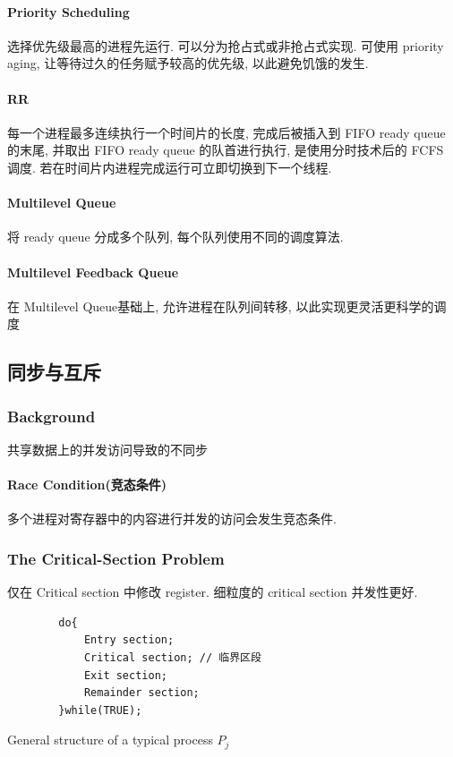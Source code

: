 \paragraph{Priority Scheduling}选择优先级最高的进程先运行. 可以分为抢占式或非抢占式实现. 可使用 priority aging, 让等待过久的任务赋予较高的优先级, 以此避免饥饿的发生. 

\paragraph{RR} 每一个进程最多连续执行一个时间片的长度, 完成后被插入到 FIFO ready queue 的末尾, 并取出 FIFO ready queue 的队首进行执行, 是使用分时技术后的 FCFS 调度. 若在时间片内进程完成运行可立即切换到下一个线程. 

\paragraph{Multilevel Queue}将 ready queue 分成多个队列, 每个队列使用不同的调度算法. 

\paragraph{Multilevel Feedback Queue}在 Multilevel Queue基础上, 允许进程在队列间转移, 以此实现更灵活更科学的调度

\subsection{同步与互斥}
\subsubsection{Background}
共享数据上的并发访问导致的不同步

\paragraph{Race Condition(竞态条件)}多个进程对寄存器中的内容进行并发的访问会发生竞态条件. 

\subsubsection{The Critical-Section Problem}
仅在 Critical section 中修改 register. 细粒度的 critical section 并发性更好. 

\begin{code}
    \begin{verbatim}
        do{
            Entry section;
            Critical section; // 临界区段
            Exit section;
            Remainder section;
        }while(TRUE);
    \end{verbatim}
    \caption{General structure of a typical process $P_j$}
\end{code}

